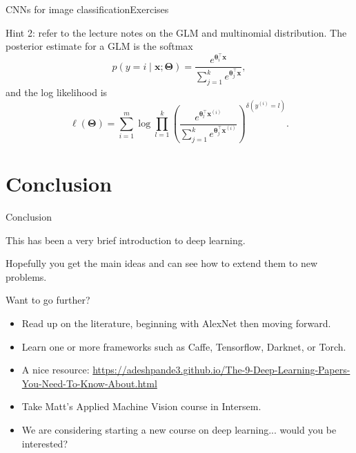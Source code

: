 \documentclass{beamer}
\renewcommand{\vec}[1]{\boldsymbol{#1}}
\begin{document}
\begin{frame}{CNNs for image classification}{Exercises}

Hint 2: refer to the lecture notes on the GLM and multinomial distribution.
The posterior estimate for a GLM is the softmax
\[ p(y = i \mid \vec{x}; \vec{\Theta}) = \frac{e^{\vec{\theta}_i^\top\vec{x}}}{\sum_{j=1}^k e^{\vec{\theta}_j^\top\vec{x}}}, \]
and the log likelihood is
\[ \ell(\vec{\Theta}) = \sum_{i=1}^m\log \prod_{l=1}^k \left(
\frac{e^{\vec{\theta}_l^\top\vec{x}^{(i)}}}{\sum_{j=1}^k e^{\vec{\theta}_j^\top\vec{x}^{(i)}}} \right)^{\delta(y^{(i)}=l)}. \]

\end{frame}

\section{Conclusion}

\begin{frame}{Conclusion}

  This has been a very brief introduction to deep learning.

  \medskip

  Hopefully you get the main ideas and can see how to extend them to
  new problems.

  \medskip

  Want to go further?
  \begin{itemize}
  \item Read up on the literature, beginning with AlexNet then moving forward.
  \item Learn one or more frameworks such as Caffe, Tensorflow,
    Darknet, or Torch.
  \item A nice resource: \url{https://adeshpande3.github.io/The-9-Deep-Learning-Papers-You-Need-To-Know-About.html}
  \item Take Matt's Applied Machine Vision course in Intersem.
  \item We are considering starting a new course on deep
    learning... would you be interested?
  \end{itemize}

\end{frame}
\end{document}
